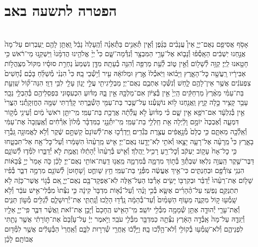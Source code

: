 \documentclass[twoside, openany, parskip=half, 11pt]{book}
\begin{document}
\begin{footnotesize}
\begin{multicols}{2}
\end{multicols}

\section*{הפטרה לתשעה באב}


\begin{multicols}{2}
 \\
אָסֹ֥ף אֲסִיפֵ֖ם נְאֻם־יְיָ֑ אֵין֩ עֲנָבִ֨ים בַּגֶּ֜פֶן וְ֯אֵ֧ין תְּ֯אֵנִ֣ים בַּתְּ֯אֵנָ֗ה וְ֯הֶֽעָלֶה֙ נָבֵ֔ל וָֽאֶתֵּ֥ן לָהֶ֖ם יַֽעַבְרֽוּם׃ עַל־מָה֙ אֲנַ֣חְנוּ יֽשְׁבִ֔ים הֵאָֽסְ֯פ֗וּ וְ֯נָב֛וֹא אֶל־עָרֵ֥י הַמִּבְצָ֖ר וְ֯נִדְּ֯מָה־שָּׁ֑ם כִּי֩ יְיָ֨ אֱלֹהֵ֤ינוּ הֲדִמָּ֨נוּ֙ וַיַּשְׁקֵ֣נוּ מֵי־רֹ֔אשׁ כִּ֥י חָטָ֖אנוּ לַֽיְיָ׃ קַוֵּ֥ה לְ֯שָׁל֖וֹם וְ֯אֵ֣ין ט֑וֹב לְ֯עֵ֥ת מַרְפֵּ֖ה וְ֯הִנֵּ֥ה בְ֯עָתָֽה׃ מִדָּ֤ן נִשְׁמַע֙ נַחְרַ֣ת סוּסָ֗יו מִקּוֹל֙ מִצְֽהֲל֣וֹת אַבִּירָ֔יו רָֽעֲשָׁ֖ה כׇּל־הָאָ֑רֶץ וַיָּב֗וֹאוּ וַיֹּֽאכְ֯לוּ֙ אֶ֣רֶץ וּמְלוֹאָ֔הּ עִ֖יר וְ֯י֥שְׁ֯בֵי בָֽהּ׃ כִּי֩ הִנְנִ֨י מְ֯שַׁלֵּ֜חַ בָּכֶ֗ם נְ֯חָשִׁים֙ צִפְעֹנִ֔ים אֲשֶׁ֥ר אֵין־לָהֶ֖ם לָ֑חַשׁ וְ֯נִשְּׁ֯כ֥וּ אֶתְכֶ֖ם נְאֻם־יְיָ׃ מַבְלִ֥יגִיתִ֖י עֲלֵ֣י יָג֑וֹן עָלַ֖י לִבִּ֥י דַוָּֽי׃ הִנֵּה־ק֞וֹל שַֽׁוְעַ֣ת בַּת־עַמִּ֗י מֵאֶ֨רֶץ֙ מַרְחַקִּ֔ים הַֽיְיָ֙ אֵ֣ין בְּ֯צִיּ֔וֹן אִם־מַלְכָּ֖הּ אֵ֣ין בָּ֑הּ מַדּ֗וּעַ הִכְעִס֛וּנִי בִּפְסִֽלֵיהֶ֖ם בְּ֯הַבְלֵ֥י נֵכָֽר׃ עָבַ֥ר קָצִ֖יר כָּ֣לָה קָ֑יִץ וַֽאֲנַ֖חְנוּ ל֥וֹא נוֹשָֽׁעְ֯נוּ׃ עַל־שֶׁ֥בֶר בַּת־עַמִּ֖י הָשְׁ֯בַּ֑רְתִּי קָדַ֕רְתִּי שַׁמָּ֖ה הֶחֱזִקָֽתְ֯נִי׃ הַצֳרִי֙ אֵ֣ין בְּ֯גִלְעָ֔ד אִם־רֹפֵ֖א אֵ֣ין שָׁ֑ם כִּ֗י מַדּ֨וּעַ֙ לֹ֣א עָֽלְ֯תָ֔ה אֲרֻכַ֖ת בַּת־עַמִּֽי׃ מִֽי־יִתֵּ֤ן רֹאשִׁי֙ מַ֔יִם וְ֯עֵינִ֖י מְ֯ק֣וֹר דִּמְעָ֑ה וְ֯אֶבְכֶּה֙ יוֹמָ֣ם וָלַ֔יְלָה אֵ֖ת חַֽלְלֵ֥י בַת־עַמִּֽי׃ מִֽי־יִתְּ֯נֵ֣נִי בַמִּדְבָּ֗ר מְ֯לוֹן֙ אֹֽרְ֯חִ֔ים וְ֯אֶֽעֶזְבָה֙ אֶת־עַמִּ֔י וְ֯אֵֽלְ֯כָ֖ה מֵאִתָּ֑ם כִּ֤י כֻלָּם֙ מְ֯נָ֣אֲפִ֔ים עֲצֶ֖רֶת בֹּֽגְ֯דִֽים׃ וַֽיַּדְרְ֯כ֤וּ אֶת־לְ֯שׁוֹנָם֙ קַשְׁתָּ֣ם שֶׁ֔קֶר וְ֯לֹ֥א לֶאֱמוּנָ֖ה גָּֽבְ֯ר֣וּ בָאָ֑רֶץ כִּי֩ מֵֽרָעָ֨ה אֶל־רָעָ֧ה יָצָ֛אוּ וְ֯אֹתִ֥י לֹֽא־יָדָ֖עוּ נְאֻם־יְיָ׃ אִ֤ישׁ מֵֽרֵעֵ֨הוּ֙ הִשָּׁמֵ֔רוּ וְ֯עַל־כׇּל־אָ֖ח אַל־תִּבְטָ֑חוּ כִּ֤י כׇל־אָח֙ עָק֣וֹב יַעְקֹ֔ב וְ֯כׇל־רֵ֖עַ רָכִ֥יל יַֽהֲלֹֽךְ׃ וְ֯אִ֤ישׁ בְּ֯רֵעֵ֨הוּ֙ יְ֯הָתֵ֔לּוּ וֶאֱמֶ֖ת לֹ֣א יְ֯דַבֵּ֑רוּ לִמְּ֯ד֧וּ לְ֯שׁוֹנָ֛ם דַּבֶּר־שֶׁ֖קֶר הַֽעֲוֵ֥ה נִלְאֽוּ׃ שִׁבְתְּ֯ךָ֖ בְּ֯ת֣וֹךְ מִרְמָ֑ה בְּ֯מִרְמָ֛ה מֵֽאֲנ֥וּ דַֽעַת־אוֹתִ֖י נְאֻם־יְיָ׃ לָכֵ֗ן כֹּ֤ה אָמַר֙ יְיָ֣ צְ֯בָא֔וֹת הִנְנִ֥י צֽוֹרְ֯פָ֖ם וּבְחַנְתִּ֑ים כִּי־אֵ֣יךְ אֶעֱשֶׂ֔ה מִפְּ֯נֵ֖י בַּת־עַמִּֽי׃ חֵ֥ץ שָׁוחֻ֛ט [שָׁח֛וּט] לְ֯שׁוֹנָ֖ם מִרְמָ֣ה דִבֵּ֑ר בְּ֯פִ֗יו שָׁל֤וֹם אֶת־רֵעֵ֨הוּ֙ יְ֯דַבֵּ֗ר וּבְקִרְבּ֖וֹ יָשִׂ֥ים אָרְ֯בּֽוֹ׃ הַעַל־אֵ֥לֶּה לֹֽא־אֶפְקָד־בָּ֖ם נְאֻם־יְיָ֑ אִ֚ם בְּ֯ג֣וֹי אֲשֶׁר־כָּזֶ֔ה לֹ֥א תִתְנַקֵּ֖ם נַפְשִֽׁי׃ עַל־הֶ֨הָרִ֜ים אֶשָּׂ֧א בְ֯כִ֣י וָנֶ֗הִי וְ֯עַל־נְ֯א֤וֹת מִדְבָּר֙ קִינָ֔ה כִּ֤י נִצְּ֯תוּ֙ מִבְּ֯לִי־אִ֣ישׁ עֹבֵ֔ר וְ֯לֹ֥א שָֽׁמְ֯ע֖וּ ק֣וֹל מִקְנֶ֑ה מֵע֤וֹף הַשָּׁמַ֨יִם֙ וְ֯עַד־בְּ֯הֵמָ֔ה נָֽדְ֯ד֖וּ הָלָֽכוּ׃ וְ֯נָֽתַתִּ֧י אֶת־יְ֯רֽוּשָׁלַ֛םִ לְ֯גַלִּ֖ים מְ֯ע֣וֹן תַּנִּ֑ים וְ֯אֶת־עָרֵ֧י יְ֯הוּדָ֛ה אֶתֵּ֥ן שְׁ֯מָמָ֖ה מִבְּ֯לִ֖י יוֹשֵֽׁב׃ מִֽי־הָאִ֤ישׁ הֶֽחָכָם֙ וְ֯יָבֵ֣ן אֶת־זֹ֔את וַֽאֲשֶׁ֨ר דִּבֶּ֧ר פִּֽי־יְיָ֛ אֵלָ֖יו וְ֯יַגִּדָ֑הּ עַל־מָה֙ אָֽבְ֯דָ֣ה הָאָ֔רֶץ נִצְּ֯תָ֥ה כַמִּדְבָּ֖ר מִבְּ֯לִ֖י עֹבֵֽר׃ וַיֹּ֣אמֶר יְיָ֔ עַל־עָזְ֯בָם֙ אֶת־תּ֣וֹרָתִ֔י אֲשֶׁ֥ר נָתַ֖תִּי לִפְנֵיהֶ֑ם וְ֯לֹא־שָֽׁמְ֯ע֥וּ בְ֯קוֹלִ֖י וְ֯לֹא־הָ֥לְ֯כוּ בָֽהּ׃ וַיֵּ֣לְ֯כ֔וּ אַֽחֲרֵ֖י שְׁ֯רִר֣וּת לִבָּ֑ם וְ֯אַֽחֲרֵי֙ הַבְּ֯עָלִ֔ים אֲשֶׁ֥ר לִמְּ֯ד֖וּם אֲבוֹתָֽם׃ לָכֵ֗ן 
\end{multicols}
\end{footnotesize}
\end{document}
